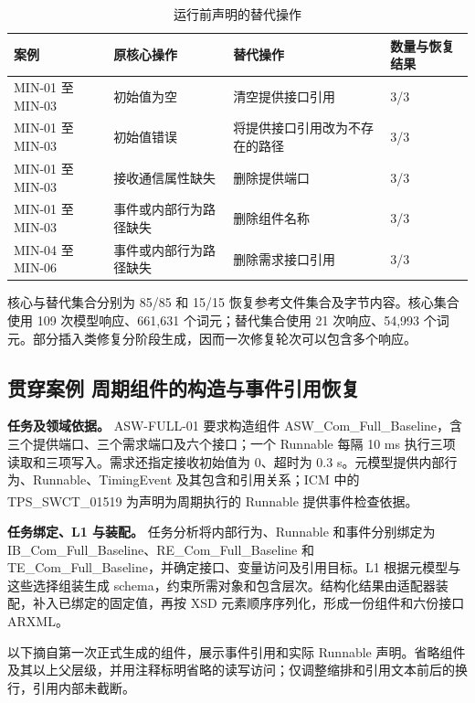 \documentclass[pdflatex,iicol,sn-mathphys-num]{sn-jnl}
\newcommand{\paperref}[1]{\textsuperscript{\textcolor{citationred}{\citep{#1}}}}
\begin{document}
\begin{table}[!tbp]
\centering
\caption{运行前声明的替代操作}\label{tab:A4}
\small
\setlength{\tabcolsep}{4pt}
\renewcommand{\arraystretch}{1.20}
\begin{tabularx}{\textwidth}{@{}L L L L@{}}
\toprule
\textbf{案例} & \textbf{原核心操作} & \textbf{替代操作} & \textbf{数量与恢复结果} \\
\midrule
MIN-01 至 MIN-03 & 初始值为空 & 清空提供接口引用 & 3/3 \\
MIN-01 至 MIN-03 & 初始值错误 & 将提供接口引用改为不存在的路径 & 3/3 \\
MIN-01 至 MIN-03 & 接收通信属性缺失 & 删除提供端口 & 3/3 \\
MIN-01 至 MIN-03 & 事件或内部行为路径缺失 & 删除组件名称 & 3/3 \\
MIN-04 至 MIN-06 & 事件或内部行为路径缺失 & 删除需求接口引用 & 3/3 \\
\bottomrule
\end{tabularx}
\end{table}

核心与替代集合分别为 85/85 和 15/15 恢复参考文件集合及字节内容。核心集合使用 109 次模型响应、661,631 个词元；替代集合使用 21 次响应、54,993 个词元。部分插入类修复分阶段生成，因而一次修复轮次可以包含多个响应。


\subsection{贯穿案例 周期组件的构造与事件引用恢复}\label{app:A-4}

\textbf{任务及领域依据。} ASW-FULL-01 要求构造组件 ASW\_Com\_Full\_Baseline，含三个提供端口、三个需求端口及六个接口；一个 Runnable 每隔 10 ms 执行三项读取和三项写入。需求还指定接收初始值为 0、超时为 0.3 s。元模型提供内部行为、Runnable、TimingEvent 及其包含和引用关系；ICM 中的 TPS\_SWCT\_01519 为声明为周期执行的 Runnable 提供事件检查依据\paperref{AUTOSAR2015SoftwareComponentTemplate422}。


\textbf{任务绑定、L1 与装配。} 任务分析将内部行为、Runnable 和事件分别绑定为 IB\_Com\_Full\_Baseline、RE\_Com\_Full\_Baseline 和 TE\_Com\_Full\_Baseline，并确定接口、变量访问及引用目标。L1 根据元模型与这些选择组装生成 schema，约束所需对象和包含层次。结构化结果由适配器装配，补入已绑定的固定值，再按 XSD 元素顺序序列化，形成一份组件和六份接口 ARXML。


以下摘自第一次正式生成的组件，展示事件引用和实际 Runnable 声明。省略组件及其以上父层级，并用注释标明省略的读写访问；仅调整缩排和引用文本前后的换行，引用内部未截断。
\end{document}
